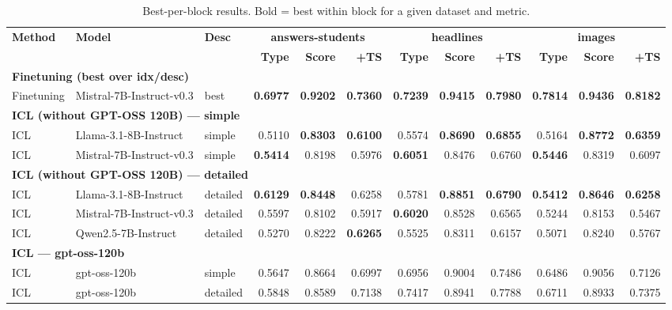 \begin{table}[t]
\centering
\scriptsize
\setlength{\tabcolsep}{3.2pt}
\begin{adjustbox}{width=\textwidth}
\begin{tabular}{l l l r r r r r r r r r}
\hline
\textbf{Method} & \textbf{Model} & \textbf{Desc} & \multicolumn{3}{c}{\textbf{answers-students}} & \multicolumn{3}{c}{\textbf{headlines}} & \multicolumn{3}{c}{\textbf{images}} \\
 &  &  & \textbf{Type} & \textbf{Score} & \textbf{+TS} & \textbf{Type} & \textbf{Score} & \textbf{+TS} & \textbf{Type} & \textbf{Score} & \textbf{+TS} \\
\hline
\multicolumn{12}{l}{\textbf{Finetuning (best over idx/desc)}} \\
\hline
Finetuning & Mistral-7B-Instruct-v0.3 & best & \textbf{0.6977} & \textbf{0.9202} & \textbf{0.7360} & \textbf{0.7239} & \textbf{0.9415} & \textbf{0.7980} & \textbf{0.7814} & \textbf{0.9436} & \textbf{0.8182} \\
\hline\hline
\multicolumn{12}{l}{\textbf{ICL (without GPT-OSS 120B) — simple}} \\
\hline
ICL & Llama-3.1-8B-Instruct & simple & 0.5110 & \textbf{0.8303} & \textbf{0.6100} & 0.5574 & \textbf{0.8690} & \textbf{0.6855} & 0.5164 & \textbf{0.8772} & \textbf{0.6359} \\
ICL & Mistral-7B-Instruct-v0.3 & simple & \textbf{0.5414} & 0.8198 & 0.5976 & \textbf{0.6051} & 0.8476 & 0.6760 & \textbf{0.5446} & 0.8319 & 0.6097 \\
\hline\hline
\multicolumn{12}{l}{\textbf{ICL (without GPT-OSS 120B) — detailed}} \\
\hline
ICL & Llama-3.1-8B-Instruct & detailed & \textbf{0.6129} & \textbf{0.8448} & 0.6258 & 0.5781 & \textbf{0.8851} & \textbf{0.6790} & \textbf{0.5412} & \textbf{0.8646} & \textbf{0.6258} \\
ICL & Mistral-7B-Instruct-v0.3 & detailed & 0.5597 & 0.8102 & 0.5917 & \textbf{0.6020} & 0.8528 & 0.6565 & 0.5244 & 0.8153 & 0.5467 \\
ICL & Qwen2.5-7B-Instruct & detailed & 0.5270 & 0.8222 & \textbf{0.6265} & 0.5525 & 0.8311 & 0.6157 & 0.5071 & 0.8240 & 0.5767 \\
\hline\hline
\multicolumn{12}{l}{\textbf{ICL — gpt-oss-120b}} \\
\hline
ICL & gpt-oss-120b & simple & 0.5647 & 0.8664 & 0.6997 & 0.6956 & 0.9004 & 0.7486 & 0.6486 & 0.9056 & 0.7126 \\
ICL & gpt-oss-120b & detailed & 0.5848 & 0.8589 & 0.7138 & 0.7417 & 0.8941 & 0.7788 & 0.6711 & 0.8933 & 0.7375 \\
\hline\hline
\end{tabular}
\end{adjustbox}
\caption{Best-per-block results. Bold = best within block for a given dataset and metric.}
\end{table}